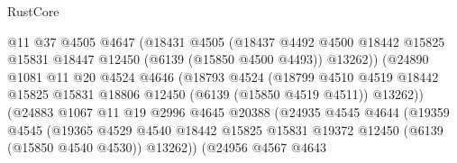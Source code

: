 \begin{lexlean}{RustCore}
\begin{coremodule}
                                @11
                                @37
                                @4505
                                @4647
                                (@18431
                                  @4505
                                  (@18437
                                    @4492
                                    @4500
                                    @18442
                                    @15825
                                    @15831
                                    @18447
                                    @12450
                                    (@6139 (@15850 @4500 @4493))
                                    @13262))
                                (@24890
                                  @1081
                                  @11
                                  @20
                                  @4524
                                  @4646
                                  (@18793
                                    @4524
                                    (@18799
                                      @4510
                                      @4519
                                      @18442
                                      @15825
                                      @15831
                                      @18806
                                      @12450
                                      (@6139 (@15850 @4519 @4511))
                                      @13262))
                                  (@24883
                                    @1067
                                    @11
                                    @19
                                    @2996
                                    @4645
                                    @20388
                                    (@24935
                                      @4545
                                      @4644
                                      (@19359
                                        @4545
                                        (@19365
                                          @4529
                                          @4540
                                          @18442
                                          @15825
                                          @15831
                                          @19372
                                          @12450
                                          (@6139 (@15850 @4540 @4530))
                                          @13262))
                                      (@24956
                                        @4567
                                        @4643

\end{coremodule}
\end{lexlean}
